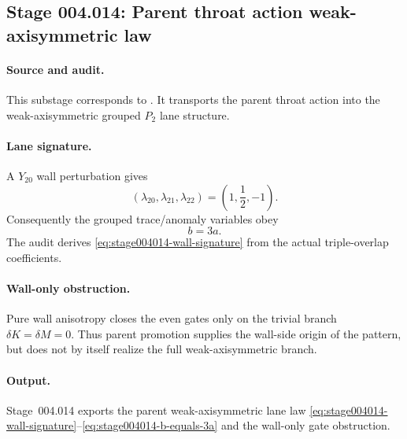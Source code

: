 \subsection*{Stage 004.014: Parent throat action weak-axisymmetric law}
\label{subsec:stage004014-parent-throat-action-weak-axisym}

\paragraph{Source and audit.}
This substage corresponds to
.
It transports the parent throat action into the weak-axisymmetric grouped
\(P_2\) lane structure.

\paragraph{Lane signature.}
A \(Y_{20}\) wall perturbation gives
\begin{equation}
\label{eq:stage004014-wall-signature}
(\lambda_{20},\lambda_{21},\lambda_{22})
=\left(1,\frac12,-1\right).
\end{equation}
Consequently the grouped trace/anomaly variables obey
\begin{equation}
\label{eq:stage004014-b-equals-3a}
b=3a.
\end{equation}
The audit derives \eqref{eq:stage004014-wall-signature} from the actual
triple-overlap coefficients.

\paragraph{Wall-only obstruction.}
Pure wall anisotropy closes the even gates only on the trivial branch
\(\delta K=\delta M=0\).  Thus parent promotion supplies the wall-side origin
of the pattern, but does not by itself realize the full weak-axisymmetric
branch.

\paragraph{Output.}
Stage~004.014 exports the parent weak-axisymmetric lane law
\eqref{eq:stage004014-wall-signature}--\eqref{eq:stage004014-b-equals-3a}
and the wall-only gate obstruction.
